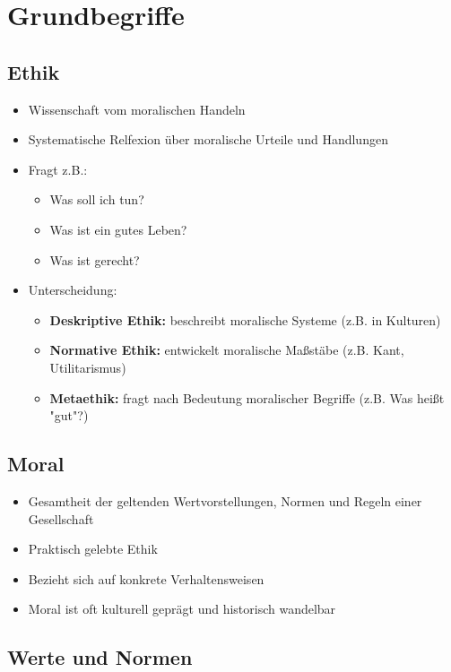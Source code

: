 
\section{Grundbegriffe}


\subsection{Ethik}

\begin{itemize}
    \item Wissenschaft vom moralischen Handeln
    \item Systematische Relfexion über moralische Urteile und Handlungen
    \item Fragt z.B.:
    \begin{itemize}
        \item Was soll ich tun?
        \item Was ist ein gutes Leben?
        \item Was ist gerecht?
    \end{itemize}
    \item Unterscheidung:
    \begin{itemize}
        \item \textbf{Deskriptive Ethik:} beschreibt moralische Systeme (z.B. in Kulturen)
        \item \textbf{Normative Ethik:} entwickelt moralische Maßstäbe (z.B. Kant, Utilitarismus)
        \item \textbf{Metaethik:} fragt nach Bedeutung moralischer Begriffe (z.B. Was heißt "gut"?)
    \end{itemize}
\end{itemize}

\subsection{Moral}

\begin{itemize}
    \item Gesamtheit der geltenden Wertvorstellungen, Normen und Regeln einer Gesellschaft
    \item Praktisch gelebte Ethik
    \item Bezieht sich auf konkrete Verhaltensweisen
    \item Moral ist oft kulturell geprägt und historisch wandelbar
\end{itemize}

\subsection{Werte und Normen}


